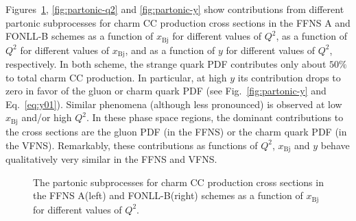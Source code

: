 \documentclass[pdftex,twocolumn,epjc3]{svjour3}          %
\newcommand{\xbj}{\ensuremath{x_{\text{Bj}}}\xspace}
\newcommand{\fonll} {{FONLL-B}\xspace}
\newcommand{\ffns} {{FFNS A}\xspace}
\begin{document}
Figures~\ref{fig:partonic-x}, \ref{fig:partonic-q2} and \ref{fig:partonic-y} show contributions from different partonic subprocesses for charm CC production cross sections in the \ffns and \fonll schemes as a function of \xbj for different values of $Q^2$, as a function of $Q^2$ for different values of \xbj, and as a function of $y$ for different values of $Q^2$, respectively.
In both scheme, the strange quark PDF contributes only about $50\%$ to total charm CC production. In particular, at high $y$ its contribution drops to zero in favor of the gluon or charm quark PDF (see Fig.~\ref{fig:partonic-y} and Eq.~\ref{eq:y01}). Similar phenomena (although less pronounced) is observed at low \xbj and/or high $Q^2$. In these phase space regions, the dominant contributions to the cross sections are the gluon PDF (in the FFNS) or the charm quark PDF (in the VFNS). Remarkably, these contributions as functions of $Q^2$, \xbj and $y$ behave qualitatively very similar in the FFNS and VFNS.

\begin{figure}
    \centering
    \caption{The partonic subprocesses for charm CC production cross sections in the \ffns (left) and \fonll (right) schemes as a function of \xbj for different values of $Q^2$.}
    \label{fig:partonic-x}
\end{figure}
\end{document}
